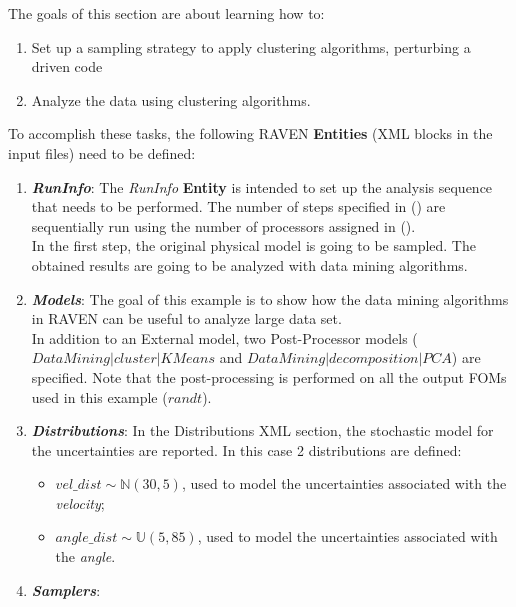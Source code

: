 The goals of this section are about learning how to:
 \begin{enumerate}
   \item Set up a sampling strategy to apply clustering algorithms, perturbing a driven code
  \item Analyze the data using clustering algorithms.
\end{enumerate}
To accomplish these tasks, the following RAVEN \textbf{Entities} (XML blocks in the input files) need to be defined:
\begin{enumerate}
   \item \textbf{\textit{RunInfo}}:
   The \textit{RunInfo} \textbf{Entity} is intended  to set up the analysis sequence that
   needs to be performed. The number of steps specified in () are sequentially run
   using the number of processors assigned in ().
   \\In the first step, the original physical model is going to be sampled.
   The obtained results are going to be analyzed with data mining
   algorithms.
   \item \textbf{\textit{Models}}:
 The goal of this example is to show how the
 data mining algorithms in RAVEN can be useful to analyze large data set.
 \\In addition to an External model, two Post-Processor models ($DataMining|cluster|KMeans$ and $DataMining|decomposition|PCA$) are specified. Note that the post-processing is performed on all the output FOMs used in this example ($r and t$).
   \item \textbf{\textit{Distributions}}:
  In the Distributions XML section, the stochastic model for the
  uncertainties are reported. In this case 2 distributions are defined:
  \begin{itemize}
    \item $vel\_dist \sim \mathbb{N}(30,5)$, used to model the uncertainties
    associated with  the \textit{velocity};
    \item  $angle\_dist \sim \mathbb{U}(5,85)$,  used to
    model the uncertainties associated with the \textit{angle}.
  \end{itemize}
   \item \textbf{\textit{Samplers}}:

\end{enumerate}
